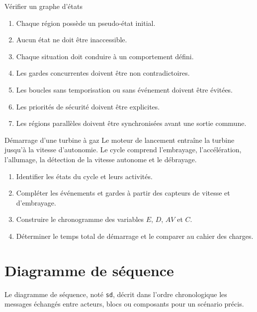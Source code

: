 \begin{TLLogicMethod}{Vérifier un graphe d'états}
\begin{enumerate}
  \item Chaque région possède un pseudo-état initial.
  \item Aucun état ne doit être inaccessible.
  \item Chaque situation doit conduire à un comportement défini.
  \item Les gardes concurrentes doivent être non contradictoires.
  \item Les boucles sans temporisation ou sans événement doivent être évitées.
  \item Les priorités de sécurité doivent être explicites.
  \item Les régions parallèles doivent être synchronisées avant une sortie commune.
\end{enumerate}
\end{TLLogicMethod}

\begin{TLLogicApplication}{Démarrage d'une turbine à gaz}
Le moteur de lancement entraîne la turbine jusqu'à la vitesse d'autonomie. Le cycle comprend l'embrayage, l'accélération, l'allumage, la détection de la vitesse autonome et le débrayage.
\begin{enumerate}
  \item Identifier les états du cycle et leurs activités.
  \item Compléter les événements et gardes à partir des capteurs de vitesse et d'embrayage.
  \item Construire le chronogramme des variables $E$, $D$, $AV$ et $C$.
  \item Déterminer le temps total de démarrage et le comparer au cahier des charges.
\end{enumerate}
\end{TLLogicApplication}

\section{Diagramme de séquence}
\label{sec:sequence}

Le diagramme de séquence, noté \texttt{sd}, décrit dans l'ordre chronologique les messages échangés entre acteurs, blocs ou composants pour un scénario précis.

\begin{center}\TLDiagrammeSequenceSimple\end{center}

